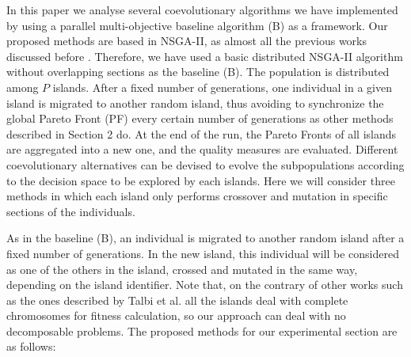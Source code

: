 \documentclass[preprint]{elsarticle}
\begin{document}
In this paper we analyse several coevolutionary algorithms we have implemented by using a parallel multi-objective baseline algorithm (B) as a framework. Our proposed methods are based in NSGA-II, as almost all the previous works discussed before \cite{Dorronsoro13superlinear,Durillo08masterslave,Hiroyasu07discussion,Deb03distributed,Xiao03specialized,Wang09parallel,Martens13asynchronous}. Therefore, we have used a basic distributed NSGA-II algorithm without overlapping sections as the baseline (B). The population is distributed among $P$ islands. After a fixed number of generations, one individual in a given island is migrated to another random island, thus avoiding to synchronize the global Pareto Front (PF) every certain number of generations as other methods described in Section 2 do. At the end of the run, the Pareto Fronts of all islands are aggregated into a new one, and the quality measures are evaluated.
Different coevolutionary alternatives can be devised to evolve the subpopulations according to the decision space to be explored by each islands. Here we will consider three methods in which each island only performs crossover and mutation in specific sections of the individuals.



%

As in the baseline (B), an individual is migrated to another random island after a fixed number of generations. In the new island, this individual will be considered as one of the others in the island, crossed and mutated in the same way, depending on the island identifier. Note that, on the contrary of other works such as the ones described by Talbi et al. \citep{Talbi08Parallel} all the islands deal with complete chromosomes for fitness calculation, so our approach can deal with no decomposable problems. The proposed methods for our experimental section are as follows:
\end{document}
